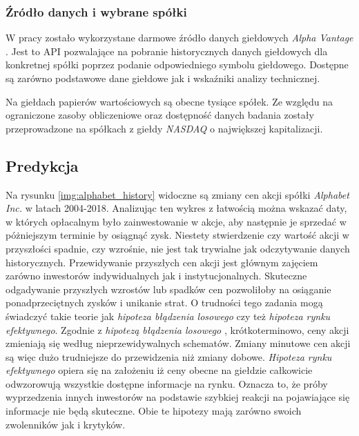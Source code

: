 \documentclass[a4paper, twoside, 11pt, openright]{article}
\begin{document}
\subsubsection{Źródło danych i wybrane spółki}

W pracy zostało wykorzystane darmowe źródło danych giełdowych \textit{Alpha Vantage} \cite{alphavantage}. Jest to API pozwalające na pobranie historycznych danych giełdowych dla konkretnej spółki poprzez podanie odpowiedniego symbolu giełdowego. Dostępne są zarówno podstawowe dane giełdowe jak i wskaźniki analizy technicznej. 

\bigskip

Na giełdach papierów wartościowych są obecne tysiące spółek. Ze względu na ograniczone zasoby obliczeniowe oraz dostępność danych badania zostały przeprowadzone na spółkach z giełdy \textit{NASDAQ} o największej kapitalizacji.

\subsection{Predykcja}

Na rysunku \ref{img:alphabet_history} widoczne są zmiany cen akcji spółki \textit{Alphabet Inc.} w latach 2004-2018. Analizując ten wykres z łatwością można wskazać daty, w których opłacalnym było zainwestowanie w akcje, aby następnie je sprzedać w póżniejszym terminie by osiągnąć zysk. Niestety stwierdzenie czy wartość akcji w przyszłości spadnie, czy wzrośnie, nie jest tak trywialne jak odczytywanie danych historycznych. Przewidywanie przyszłych cen akcji jest głównym zajęciem zarówno inwestorów indywidualnych jak i instytucjonalnych. Skuteczne odgadywanie przyszłych wzrostów lub spadków cen pozwoliłoby na osiąganie ponadprzeciętnych zysków i unikanie strat. O trudności tego zadania mogą świadczyć takie teorie jak \textit{hipoteza błądzenia losowego} czy też \textit{hipoteza rynku efektywnego}. Zgodnie z \textit{hipotezą błądzenia losowego} \cite{randwalk}, krótkoterminowo, ceny akcji zmieniają się według nieprzewidywalnych schematów. Zmiany minutowe cen akcji są więc dużo trudniejsze do przewidzenia niż zmiany dobowe. \textit{Hipoteza rynku efektywnego} \cite{efficientmarket} opiera się na założeniu iż ceny obecne na giełdzie całkowicie odwzorowują wszystkie dostępne informacje na rynku. Oznacza to, że próby wyprzedzenia innych inwestorów na podstawie szybkiej reakcji na pojawiające się informacje nie będą skuteczne. Obie te hipotezy mają zarówno swoich zwolenników jak i krytyków.
\end{document}
